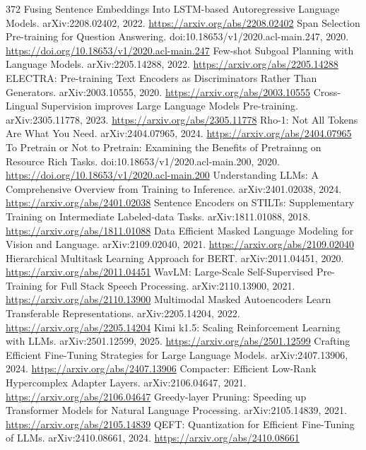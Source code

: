 \documentclass[11pt]{article}
\begin{document}
\begin{thebibliography}{372}
 Fusing Sentence Embeddings Into LSTM-based Autoregressive Language Models. arXiv:2208.02402, 2022. \url{https://arxiv.org/abs/2208.02402}
 Span Selection Pre-training for Question Answering. doi:10.18653/v1/2020.acl-main.247, 2020. \url{https://doi.org/10.18653/v1/2020.acl-main.247}
 Few-shot Subgoal Planning with Language Models. arXiv:2205.14288, 2022. \url{https://arxiv.org/abs/2205.14288}
 ELECTRA: Pre-training Text Encoders as Discriminators Rather Than Generators. arXiv:2003.10555, 2020. \url{https://arxiv.org/abs/2003.10555}
 Cross-Lingual Supervision improves Large Language Models Pre-training. arXiv:2305.11778, 2023. \url{https://arxiv.org/abs/2305.11778}
 Rho-1: Not All Tokens Are What You Need. arXiv:2404.07965, 2024. \url{https://arxiv.org/abs/2404.07965}
 To Pretrain or Not to Pretrain: Examining the Benefits of Pretrainng on Resource Rich Tasks. doi:10.18653/v1/2020.acl-main.200, 2020. \url{https://doi.org/10.18653/v1/2020.acl-main.200}
 Understanding LLMs: A Comprehensive Overview from Training to Inference. arXiv:2401.02038, 2024. \url{https://arxiv.org/abs/2401.02038}
 Sentence Encoders on STILTs: Supplementary Training on Intermediate Labeled-data Tasks. arXiv:1811.01088, 2018. \url{https://arxiv.org/abs/1811.01088}
 Data Efficient Masked Language Modeling for Vision and Language. arXiv:2109.02040, 2021. \url{https://arxiv.org/abs/2109.02040}
 Hierarchical Multitask Learning Approach for BERT. arXiv:2011.04451, 2020. \url{https://arxiv.org/abs/2011.04451}
 WavLM: Large-Scale Self-Supervised Pre-Training for Full Stack Speech Processing. arXiv:2110.13900, 2021. \url{https://arxiv.org/abs/2110.13900}
 Multimodal Masked Autoencoders Learn Transferable Representations. arXiv:2205.14204, 2022. \url{https://arxiv.org/abs/2205.14204}
 Kimi k1.5: Scaling Reinforcement Learning with LLMs. arXiv:2501.12599, 2025. \url{https://arxiv.org/abs/2501.12599}
 Crafting Efficient Fine-Tuning Strategies for Large Language Models. arXiv:2407.13906, 2024. \url{https://arxiv.org/abs/2407.13906}
 Compacter: Efficient Low-Rank Hypercomplex Adapter Layers. arXiv:2106.04647, 2021. \url{https://arxiv.org/abs/2106.04647}
 Greedy-layer Pruning: Speeding up Transformer Models for Natural Language Processing. arXiv:2105.14839, 2021. \url{https://arxiv.org/abs/2105.14839}
 QEFT: Quantization for Efficient Fine-Tuning of LLMs. arXiv:2410.08661, 2024. \url{https://arxiv.org/abs/2410.08661}

\end{thebibliography}
\end{document}
